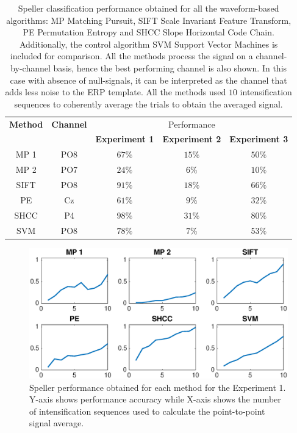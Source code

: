 \begin{table}[h!]
\caption[Pseudo-real Dataset Speller Performance]{Speller classification performance obtained for all the waveform-based algorithms: MP Matching Pursuit, SIFT Scale Invariant Feature Transform, PE Permutation Entropy and SHCC Slope Horizontal Code Chain. Additionally, the control algorithm SVM Support Vector Machines is included for comparison.  All the methods process the signal on a channel-by-channel basis, hence the best performing channel is also shown. In this case with absence of null-signals, it can be interpreted as the channel that adds less noise to the ERP template.  All the methods used $10$ intensification sequences to coherently average the trials to obtain the averaged signal. }
\centering
\begin{tabular}{ccccc}
\toprule
\textbf{Method}	& \textbf{Channel} &   \multicolumn{3}{c}{Performance} \\
 	&  &  \textbf{Experiment 1} & \textbf{Experiment 2}	& \textbf{Experiment 3}\\
\midrule
MP 1 & PO8  & $67\%$ & $15\%$ & $50\%$\\
MP 2 & PO7 & $24\%$ & $6\%$ & $10\%$\\
SIFT  & PO8 & $91\%$ & $18\%$ & $66\%$\\
PE     & Cz & $61\%$ & $9\%$ & $32\%$\\
SHCC & P4 & $98\%$ & $31\%$ & $80\%$\\
SVM     & PO8  & $78\%$ & $7\%$ & $53\%$\\
\bottomrule
\end{tabular}
\label{tab:results}
\end{table}

\begin{figure}[h!]
\centering
\includegraphics[width=15cm]{images/CrossPerformanceTest.eps}
\caption[Experiment I Pseudo-real Dataset Speller Performance]{Speller performance obtained for each method for the Experiment 1.  Y-axis shows performance accuracy while X-axis shows the number of intensification sequences used to calculate the point-to-point signal average.}
\label{fig:performancetest}
\end{figure}


